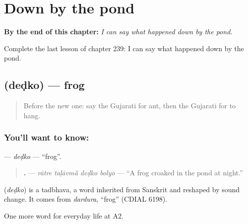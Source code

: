 
\chapter{Down by the pond}
\label{ch:gu-down-by-the-pond}

\begin{chapteropening}
\textbf{By the end of this chapter:} \emph{I can say what happened down by the pond.}

Complete the last lesson of chapter 239: I can say what happened down by the pond.
\end{chapteropening}

\section[\texorpdfstring{\gu{દેડકો} (deḍko)}{દેડકો (deḍko)}]{ (deḍko) — frog}

\label{lesson:GU-C239-dedko}



\begin{quote}
Before the new one: say the Gujarati for ant, then the Gujarati for to hang.
\end{quote}

\subsection*{You'll want to know: }
\textbf{} — \emph{deḍko} — \textquotedblleft{}frog\textquotedblright{}.

\begin{quote}
\textbf{   .} — \emph{rātre taḷāvmā̃ deḍko bolyo} — \textquotedblleft{}A frog croaked in the pond at night.\textquotedblright{}
\end{quote}

\begin{cousinweb}
\textbf{} (\emph{deḍko}) is a tadbhava, a word inherited from Sanskrit and reshaped by sound change. It comes from \emph{dardura}, \textquotedblleft{}frog\textquotedblright{} (CDIAL 6198).
\end{cousinweb}

\begin{grammarlens}[title={What you've built}]
One more word for everyday life at A2.
\end{grammarlens}

